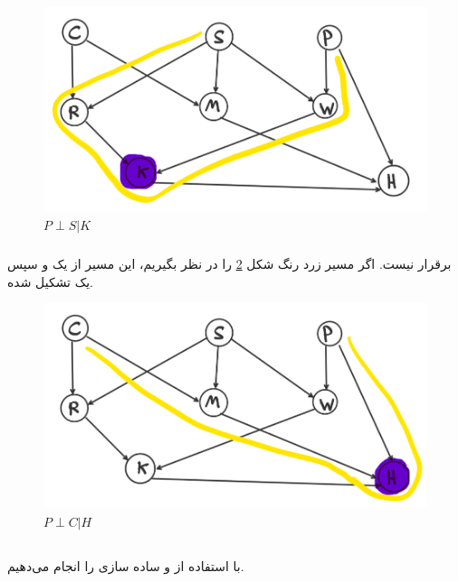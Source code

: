 \documentclass{university}
\begin{document}
\begin{figure}
    \centering
    \includegraphics[width=\textwidth]{assets/1-1-2.png}
    \caption{$P \perp S | K$}
    \label{fig:1-1-2}
\end{figure}

\subsubsection{}
برقرار نیست. اگر مسیر زرد رنگ شکل 
\ref{fig:1-1-3}
را در نظر بگیریم، این مسیر از یک 
و سپس یک 
تشکیل شده. 

\begin{figure}
    \centering
    \includegraphics[width=\textwidth]{assets/1-1-3.png}
    \caption{$P \perp C | H$}
    \label{fig:1-1-3}
\end{figure}

\subsection{}
با استفاده از 
 و 
ساده سازی را انجام می‌دهیم. 
\end{document}
